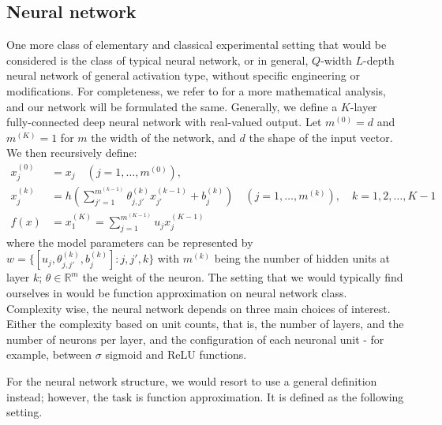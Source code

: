 \documentclass[twoside,10pt]{article}
\begin{document}
\clearpage

\subsection{Neural network}

One more class of elementary and classical experimental setting that would be considered is the class of typical neural network, or in general, $Q$-width $L$-depth neural network of general activation type, without specific engineering or modifications. For completeness, we refer to \cite{zhang2023mathematical} for a more mathematical analysis, and our network will be formulated the same. Generally, we define a $K$-layer fully-connected deep neural network with real-valued output. Let $m^{(0)}=d$ and $m^{(K)}=1$ for $m$ the width of the network, and $d$ the shape of the input vector. We then recursively define: 
\begin{align}
    x_{j}^{(0)} &= x_{j} \quad (j=1,\dots,m^{(0)}),\\ 
    x_{j}^{(k)} &= h\left(\sum^{m^{(k-1)}}_{j'=1} \theta_{j,j'}^{(k)}x_{j'}^{(k-1)}+ b_{j}^{(k)}\right)\quad (j=1,\dots,m^{(k)}), \quad k = 1,2,\dots,K-1\\
    f(x) & = x_{1}^{(K)} = \sum^{m^{(K-1)}}_{j=1} u_{j}x_{j}^{(K-1)}
\end{align}
where the model parameters can be represented by $w=\{[u_{j}, \theta_{j,j'}^{(k)}, b_{j}^{(k)}]: j,j',k\}$ with $m^{(k)}$ being the number of hidden units at layer $k$; $\theta\in \mathbb{R}^{m}$ the weight of the neuron. The setting that we would typically find ourselves in would be function approximation on neural network class. Complexity wise, the neural network depends on three main choices of interest. Either the complexity based on unit counts, that is, the number of layers, and the number of neurons per layer, and the configuration of each neuronal unit - for example, between $\sigma$ sigmoid and ReLU functions. 

For the neural network structure, we would resort to use a general definition instead; however, the task is function approximation. It is defined as the following setting. 
\vspace{2mm}
\end{document}

